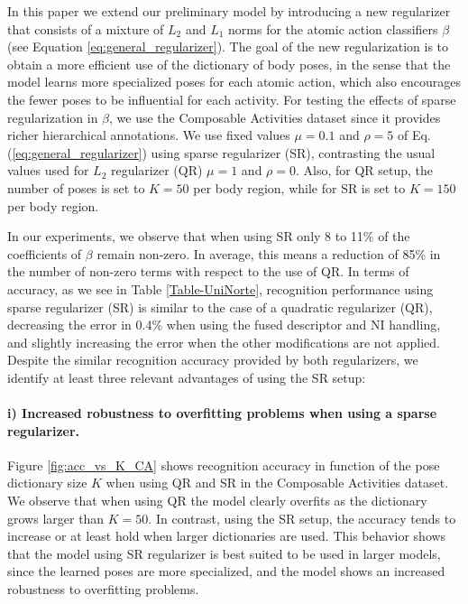 In this paper we extend our preliminary model by introducing
a new regularizer that consists of a mixture of $L_2$ and $L_1$
norms for the atomic action
classifiers $\beta$ (see Equation \ref{eq:general_regularizer}).
The goal of the new regularization is to obtain a more
efficient use of the dictionary of body poses, in the sense that the model
learns more specialized poses for each atomic action, which also encourages
the fewer poses to be influential for each activity. For testing the effects of
sparse regularization in $\beta$, we use the Composable Activities dataset since
it provides richer hierarchical annotations.
We use fixed values $\mu=0.1$ and $\rho=5$ of
Eq. (\ref{eq:general_regularizer}) using sparse regularizer
(SR), contrasting the usual values used for $L_2$ regularizer (QR) $\mu=1$ and
$\rho=0$. Also, for QR setup, the number of poses is set to $K=50$ per body
region, while for SR is set to $K=150$ per body region.

In our experiments, we observe that when using SR only 8 to 11\% of the coefficients of $\beta$
remain non-zero. In average, this means a reduction of 85\% in the number of non-zero terms 
with respect to the use of QR. In terms of accuracy, as we see in Table \ref{Table-UniNorte},
recognition performance using sparse regularizer (SR) is similar to the case of
a quadratic
regularizer (QR), decreasing the error in 0.4\% when using the fused descriptor
and NI handling, and slightly increasing the error when the other modifications
are not applied. Despite the similar recognition accuracy provided by both regularizers, we 
identify at least three relevant advantages of using the SR setup:

\paragraph{i) Increased robustness to overfitting problems when using a sparse regularizer.} Figure 
\ref{fig:acc_vs_K_CA} shows recognition accuracy in function of the pose dictionary size $K$ when 
using QR and SR in
the Composable Activities dataset. We observe that when using QR the model clearly overfits as the 
dictionary grows larger than $K=50$. In contrast, using the SR setup, the
accuracy tends to increase or at least hold when larger dictionaries are used.
This behavior shows that the model using SR regularizer is best suited to be used
in larger models, since the learned poses are more specialized, and the model shows an 
increased robustness to overfitting problems. 

